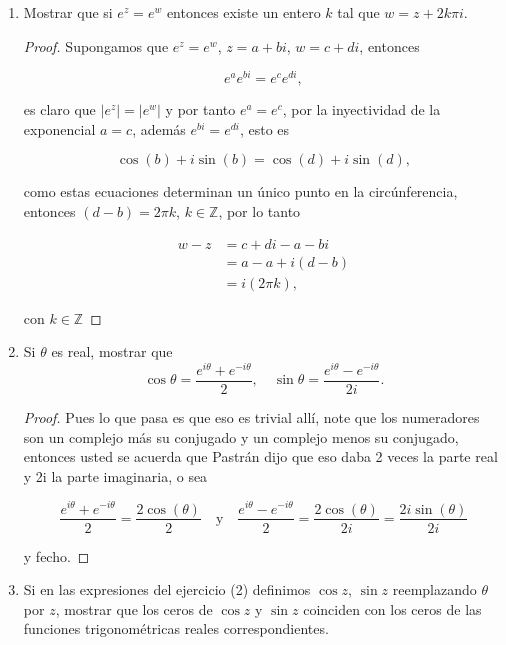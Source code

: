 \documentclass[11pt]{article}
\begin{document}
\begin{enumerate}
    \item Mostrar que si $e^z = e^w$ entonces existe un entero $k$ tal que $w = z + 2k\pi i$.\\

    \begin{proof}
    Supongamos que $e^z=e^w$, $z=a+bi$, $w=c+di$, entonces

    $$e^{a}e^{bi}=e^{c}e^{di},$$

    es claro que $|e^z|=|e^w|$ y por tanto $e^a=e^c$, por la inyectividad de la exponencial $a=c$, además $e^{bi}=e^{di}$, esto es

    $$\cos(b)+i\sin(b)=\cos(d)+i\sin(d),$$ 

    como estas ecuaciones determinan un único punto en la circúnferencia, entonces $(d-b)=2\pi k$, $k\in \mathbb{Z}$, por lo tanto

    \begin{align*}
      w-z&=c+di-a-bi\\
        &=a-a+i(d-b)\\
        &=i(2\pi k)
    ,\end{align*}

con $k\in \mathbb{Z}$

    \end{proof}

    \item Si $\theta$ es real, mostrar que
    \[
    \cos \theta = \frac{e^{i \theta} + e^{-i \theta}}{2}, \quad \sin \theta = \frac{e^{i \theta} - e^{-i \theta}}{2i}.
    \]

    \begin{proof}
    Pues lo que pasa es que eso es trivial allí, note que los numeradores son un complejo más su conjugado y un complejo menos su conjugado, entonces usted se acuerda que Pastrán dijo que eso daba 2 veces la parte real y 2i la parte imaginaria,  o sea

    $$\frac{e^{i\theta}+e^{-i\theta}}{2}=\frac{2\cos(\theta)}{2} \quad \text{y}\quad \frac{e^{i\theta}-e^{-i\theta}}{2}=\frac{2\cos(\theta)}{2i}=\frac{2i\sin(\theta)}{2i}$$

    y fecho.
    \end{proof}

    \item Si en las expresiones del ejercicio (2) definimos $\cos z$, $\sin z$ reemplazando $\theta$ por $z$, mostrar que los ceros de $\cos z$ y $\sin z$ coinciden con los ceros de las funciones trigonométricas reales correspondientes.


\end{enumerate}
\end{document}
